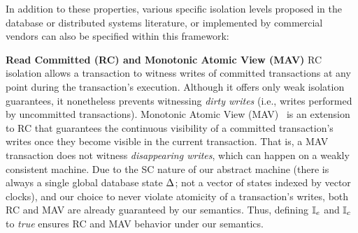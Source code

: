 In addition to these properties, various specific isolation levels
proposed in the database or distributed systems literature, or
implemented by commercial vendors can also be specified within this
framework:

\textbf{Read Committed (RC) and Monotonic Atomic View (MAV)} RC
isolation allows a transaction to witness writes of committed
transactions at any point during the transaction's execution.
Although it offers only weak isolation guarantees, it nonetheless
prevents witnessing \emph{dirty writes} (i.e., writes performed by
uncommitted transactions).  Monotonic Atomic View
(MAV)~\cite{bailishat} is an extension to RC that guarantees the
continuous visibility of a committed transaction's writes once they
become visible in the current transaction. That is, a MAV transaction
does not witness \emph{disappearing writes}, which can happen on a
weakly consistent machine. Due to the SC nature of our abstract
machine (there is always a single global database state $\Delta$; not a
vector of states indexed by vector clocks), and our choice to never
violate atomicity of a transaction's writes, both RC and MAV are
already guaranteed by our semantics.  Thus, defining $\mathbb{I}_e$ and $\mathbb{I}_c$
to \emph{true} ensures RC and MAV behavior under our semantics.

